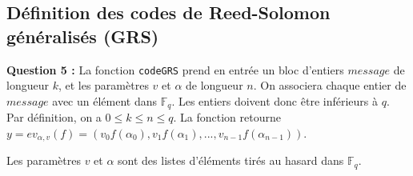 \documentclass[titlepage]{article}
\begin{document}
        \subsection{Définition des codes de Reed-Solomon généralisés (GRS)}

        \textbf{Question 5 :}
        La fonction \texttt{codeGRS} prend en entrée un bloc d'entiers $message$ de longueur $k$, et les paramètres $v$ et $\alpha$ de longueur $n$.
        On associera chaque entier de $message$ avec un élément dans $\mathbb{F}_q$. Les entiers doivent donc être inférieurs à $q$.
        Par définition, on a $0 \leqslant k \leqslant n \leqslant q$. La fonction retourne $y = ev_{\alpha,v}(f) = (v_0f(\alpha_0), v_1f(\alpha_1), ..., v_{n-1}f(\alpha_{n-1}))$.

        Les paramètres $v$ et $\alpha$ sont des listes d'éléments tirés au hasard dans $\mathbb{F}_q$.

        
\end{document}
